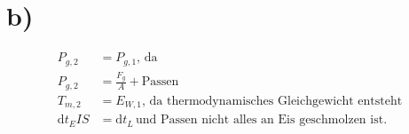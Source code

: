 

\section*{b)}

\begin{align*}
P_{g,2} & = P_{g,1}, \, \text{da} \\
P_{g,2} & = \frac{F_g}{A} + \text{Passen} \\
T_{m,2} & = E_{W,1}, \, \text{da thermodynamisches Gleichgewicht entsteht} \\
\text{d}t_EIS & = \text{d}t_L \, \text{und Passen nicht alles an Eis geschmolzen ist.}
\end{align*}